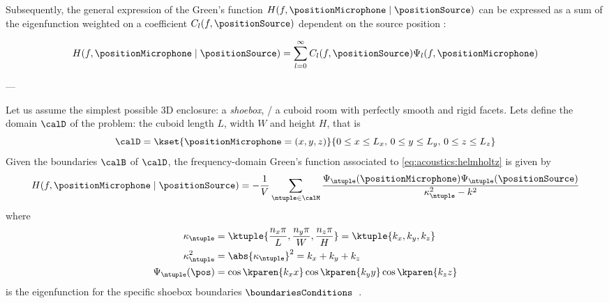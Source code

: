 Subsequently, the general expression of the Green's function $H(f, \positionMicrophone \mid \positionSource)$ can be expressed as a sum of the eigenfunction weighted on
a coefficient $C_l(f, \positionSource)$ dependent on the source position :

\begin{equation}
    \label{eq:acoustics:eigenfunction}
    H(f, \positionMicrophone \mid \positionSource) =
        \sum_{l=0}^\infty
            C_l(f, \positionSource)
            \Psi_l(f, \positionMicrophone)
\end{equation}

---


Let us assume the simplest possible 3D enclosure: a \textit{shoebox}, \ie/ a cuboid room with perfectly smooth and rigid facets.
Lets define the domain $\calD$ of the problem: the cuboid length $L$, width $W$ and height $H$, that is
\begin{equation}
    \calD = \kset{\positionMicrophone = (x,y,z)}{
        0 \le x \le L_x,\,
        0 \le y \le L_y,\,
        0 \le z \le L_z}
\end{equation}
Given the boundaries $\calB$ of $\calD$, the frequency-domain Green's function associated to \cref{eq:acoustics:helmholtz} is given by
\begin{equation}
    \label{eq:acoustics:greenBounded}
    H(f, \positionMicrophone \mid \positionSource) =
    - \frac{1}{V}
    \sum_{\ntuple \in \calM}
    \frac{\Psi_{\ntuple}(\positionMicrophone)\Psi_{\ntuple}(\positionSource)}{\kappa^2_{\ntuple} - k^2}
\end{equation}%
where
%
\begin{align}
    \kappa_{\ntuple}    &= \ktuple{\frac{n_x \pi}{L}, \frac{n_y \pi}{W}, \frac{n_z \pi}{H}} = \ktuple{k_x, k_y, k_z} \nonumber\\
    \kappa_{\ntuple}^2  &= \abs{\kappa_{\ntuple}}^2 = k_x + k_y + k_z \nonumber\\
    \Psi_{\ntuple}(\pos) &= \cos\kparen{k_x x}\cos\kparen{k_y y}\cos\kparen{k_z z} \label{eq:acoustics:mode}
\end{align}
is the eigenfunction for the specific shoebox boundaries $\boundariesConditions$~.

